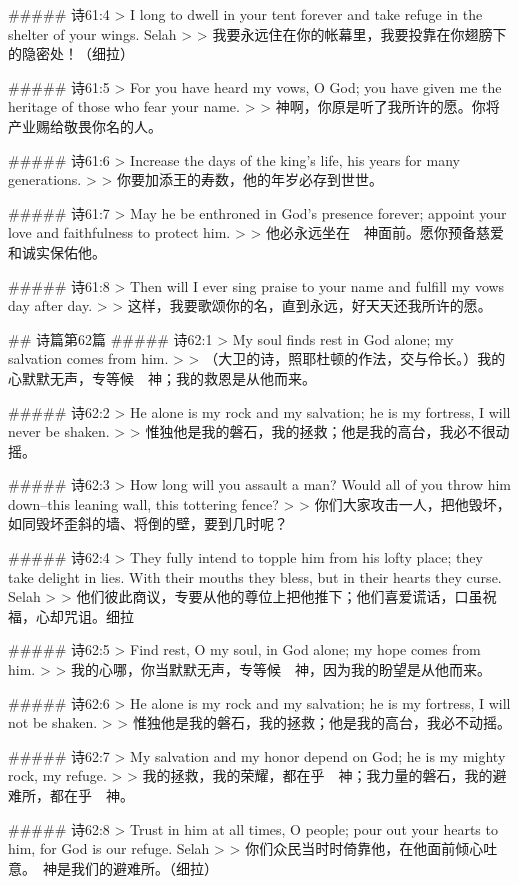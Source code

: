 ##### 诗61:4
> I long to dwell in your tent forever and take refuge in the shelter of your wings. Selah
>
> 我要永远住在你的帐幕里，我要投靠在你翅膀下的隐密处！（细拉）


##### 诗61:5
> For you have heard my vows, O God; you have given me the heritage of those who fear your name.
>
> 神啊，你原是听了我所许的愿。你将产业赐给敬畏你名的人。


##### 诗61:6
> Increase the days of the king's life, his years for many generations.
>
> 你要加添王的寿数，他的年岁必存到世世。


##### 诗61:7
> May he be enthroned in God's presence forever; appoint your love and faithfulness to protect him.
>
> 他必永远坐在　神面前。愿你预备慈爱和诚实保佑他。


##### 诗61:8
> Then will I ever sing praise to your name and fulfill my vows day after day.
>
> 这样，我要歌颂你的名，直到永远，好天天还我所许的愿。


## 诗篇第62篇
##### 诗62:1
> My soul finds rest in God alone; my salvation comes from him.
>
> （大卫的诗，照耶杜顿的作法，交与伶长。）我的心默默无声，专等候　神；我的救恩是从他而来。


##### 诗62:2
> He alone is my rock and my salvation; he is my fortress, I will never be shaken.
>
> 惟独他是我的磐石，我的拯救；他是我的高台，我必不很动摇。


##### 诗62:3
> How long will you assault a man? Would all of you throw him down--this leaning wall, this tottering fence?
>
> 你们大家攻击一人，把他毁坏，如同毁坏歪斜的墙、将倒的壁，要到几时呢？


##### 诗62:4
> They fully intend to topple him from his lofty place; they take delight in lies. With their mouths they bless, but in their hearts they curse. Selah
>
> 他们彼此商议，专要从他的尊位上把他推下；他们喜爱谎话，口虽祝福，心却咒诅。细拉


##### 诗62:5
> Find rest, O my soul, in God alone; my hope comes from him.
>
> 我的心哪，你当默默无声，专等候　神，因为我的盼望是从他而来。


##### 诗62:6
> He alone is my rock and my salvation; he is my fortress, I will not be shaken.
>
> 惟独他是我的磐石，我的拯救；他是我的高台，我必不动摇。


##### 诗62:7
> My salvation and my honor depend on God; he is my mighty rock, my refuge.
>
> 我的拯救，我的荣耀，都在乎　神；我力量的磐石，我的避难所，都在乎　神。


##### 诗62:8
> Trust in him at all times, O people; pour out your hearts to him, for God is our refuge. Selah
>
> 你们众民当时时倚靠他，在他面前倾心吐意。　神是我们的避难所。（细拉）


